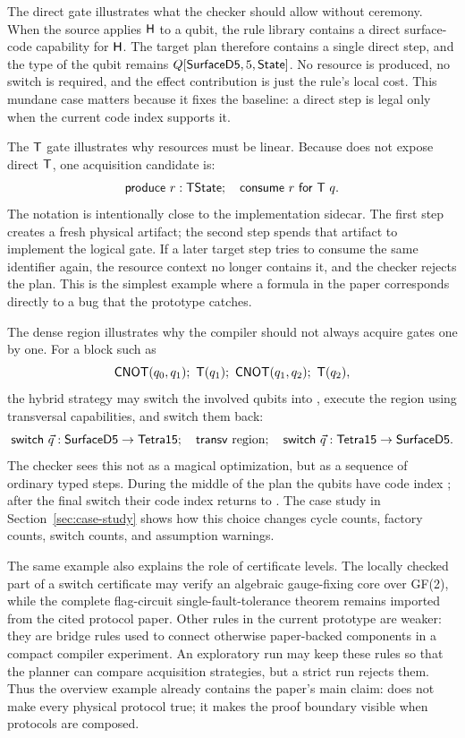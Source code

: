 The direct gate illustrates what the checker should allow without ceremony.
When the source applies $\mathsf{H}$ to a  qubit, the rule library contains a direct surface-code capability for $\mathsf{H}$.
The target plan therefore contains a single direct step, and the type of the qubit remains $Q[\mathsf{SurfaceD5},5,\mathsf{State}]$.
No resource is produced, no switch is required, and the effect contribution is just the rule's local cost.
This mundane case matters because it fixes the baseline: a direct step is legal only when the current code index supports it.

The $\mathsf{T}$ gate illustrates why resources must be linear.
Because  does not expose direct $\mathsf{T}$, one acquisition candidate is:
\[
  \mathsf{produce}\ r:\mathsf{TState} ;\quad
  \mathsf{consume}\ r\ \mathsf{for}\ \mathsf{T}\ q.
\]
The notation is intentionally close to the implementation sidecar.
The first step creates a fresh physical artifact; the second step spends that artifact to implement the logical gate.
If a later target step tries to consume the same identifier again, the resource context no longer contains it, and the checker rejects the plan.
This is the simplest example where a formula in the paper corresponds directly to a bug that the prototype catches.

The dense region illustrates why the compiler should not always acquire gates one by one.
For a block such as
\[
  \gate{CNOT}(q_0,q_1);\ \gate{T}(q_1);\ \gate{CNOT}(q_1,q_2);\ \gate{T}(q_2),
\]
the hybrid strategy may switch the involved qubits into , execute the region using transversal capabilities, and switch them back:
\[
  \mathsf{switch}\ \vec q:\mathsf{SurfaceD5}\to\mathsf{Tetra15};\quad
  \mathsf{transv}\ \text{region};\quad
  \mathsf{switch}\ \vec q:\mathsf{Tetra15}\to\mathsf{SurfaceD5}.
\]
The checker sees this not as a magical optimization, but as a sequence of ordinary typed steps.
During the middle of the plan the qubits have code index ; after the final switch their code index returns to .
The case study in Section~\ref{sec:case-study} shows how this choice changes cycle counts, factory counts, switch counts, and assumption warnings.

The same example also explains the role of certificate levels.
The locally checked part of a switch certificate may verify an algebraic gauge-fixing core over GF(2), while the complete flag-circuit single-fault-tolerance theorem remains imported from the cited protocol paper.
Other rules in the current prototype are weaker: they are \Assumed{} bridge rules used to connect otherwise paper-backed components in a compact compiler experiment.
An exploratory run may keep these rules so that the planner can compare acquisition strategies, but a strict run rejects them.
Thus the overview example already contains the paper's main claim: \system does not make every physical protocol true; it makes the proof boundary visible when protocols are composed.
